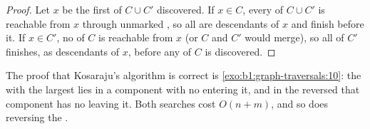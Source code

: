 \begin{proof}
Let $x$ be the first  of $C \cup C'$ discovered. If $x \in C$, every  of $C \cup C'$ is reachable from $x$
through unmarked , so all are descendants of $x$ and finish before it. If $x \in C'$, no  of $C$ is
reachable from $x$ (or $C$ and $C'$ would merge), so all of $C'$ finishes, as descendants of $x$, before any  of
$C$ is discovered.
\end{proof}

The proof that Kosaraju's algorithm is correct is \cref{exo:b1:graph-traversals:10}: the  with the largest
 lies in a component with no  entering it, and in the reversed  that component has no 
leaving it. Both searches cost $O(n + m)$, and so does reversing the .

